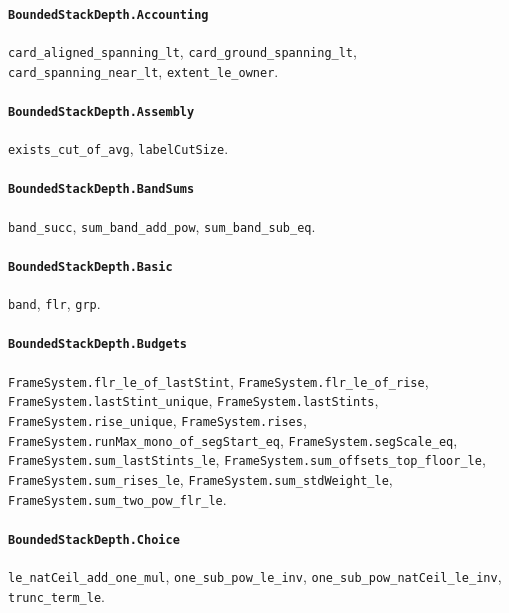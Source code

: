 \paragraph{\texttt{BoundedStackDepth.Accounting}}
{\small\raggedright \texttt{card\_aligned\_spanning\_lt}, \texttt{card\_ground\_spanning\_lt}, \texttt{card\_spanning\_near\_lt}, \texttt{extent\_le\_owner}.\par}

\paragraph{\texttt{BoundedStackDepth.Assembly}}
{\small\raggedright \texttt{exists\_cut\_of\_avg}, \texttt{labelCutSize}.\par}

\paragraph{\texttt{BoundedStackDepth.BandSums}}
{\small\raggedright \texttt{band\_succ}, \texttt{sum\_band\_add\_pow}, \texttt{sum\_band\_sub\_eq}.\par}

\paragraph{\texttt{BoundedStackDepth.Basic}}
{\small\raggedright \texttt{band}, \texttt{flr}, \texttt{grp}.\par}

\paragraph{\texttt{BoundedStackDepth.Budgets}}
{\small\raggedright \texttt{FrameSystem.flr\_le\_of\_lastStint}, \texttt{FrameSystem.flr\_le\_of\_rise}, \texttt{FrameSystem.lastStint\_unique}, \texttt{FrameSystem.lastStints}, \texttt{FrameSystem.rise\_unique}, \texttt{FrameSystem.rises}, \texttt{FrameSystem.runMax\_mono\_of\_segStart\_eq}, \texttt{FrameSystem.segScale\_eq}, \texttt{FrameSystem.sum\_lastStints\_le}, \texttt{FrameSystem.sum\_offsets\_top\_floor\_le}, \texttt{FrameSystem.sum\_rises\_le}, \texttt{FrameSystem.sum\_stdWeight\_le}, \texttt{FrameSystem.sum\_two\_pow\_flr\_le}.\par}

\paragraph{\texttt{BoundedStackDepth.Choice}}
{\small\raggedright \texttt{le\_natCeil\_add\_one\_mul}, \texttt{one\_sub\_pow\_le\_inv}, \texttt{one\_sub\_pow\_natCeil\_le\_inv}, \texttt{trunc\_term\_le}.\par}

